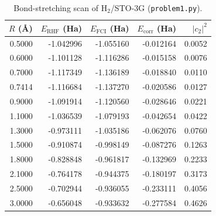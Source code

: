\begin{table}[H]
\centering\small
\begin{tabular}{rrrrr}
\toprule
$R$ (\AA) & $E_\mathrm{RHF}$ (Ha) & $E_\mathrm{FCI}$ (Ha) & $E_\mathrm{corr}$ (Ha) & $|c_2|^2$ \\
\midrule
0.5000 & -1.042996 & -1.055160 & -0.012164 & 0.0052 \\
0.6000 & -1.101128 & -1.116286 & -0.015158 & 0.0076 \\
0.7000 & -1.117349 & -1.136189 & -0.018840 & 0.0110 \\
0.7414 & -1.116684 & -1.137270 & -0.020586 & 0.0127 \\
0.9000 & -1.091914 & -1.120560 & -0.028646 & 0.0221 \\
1.1000 & -1.036539 & -1.079193 & -0.042654 & 0.0422 \\
1.3000 & -0.973111 & -1.035186 & -0.062076 & 0.0760 \\
1.5000 & -0.910874 & -0.998149 & -0.087276 & 0.1263 \\
1.8000 & -0.828848 & -0.961817 & -0.132969 & 0.2233 \\
2.1000 & -0.764178 & -0.944375 & -0.180197 & 0.3173 \\
2.5000 & -0.702944 & -0.936055 & -0.233111 & 0.4056 \\
3.0000 & -0.656048 & -0.933632 & -0.277584 & 0.4626 \\
\bottomrule
\end{tabular}
\caption{Bond-stretching scan of H$_2$/STO-3G (\texttt{problem1.py}).}
\end{table}
